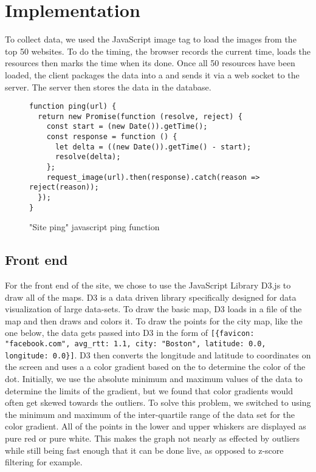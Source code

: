 \section{Implementation}\label{sec:web_ping_impl}

To collect data, we used the JavaScript image tag to load the images from the top 50 websites. To do the timing, the browser records the current time, loads the resources then marks the time when its done. Once all 50 resources have been loaded, the client packages the data into a \json and sends it via a web socket to the server. The server then stores the data in the database.

\begin{figure}
    \centering
    \small
    \begin{verbatim}
function ping(url) {
  return new Promise(function (resolve, reject) {
    const start = (new Date()).getTime();
    const response = function () {
      let delta = ((new Date()).getTime() - start);
      resolve(delta);
    };
    request_image(url).then(response).catch(reason => reject(reason));
  });
}
    \end{verbatim}
    \caption{"Site ping" javascript ping function}
    \label{fig:web_ping_code}
\end{figure}

\subsection{Front end}

For the front end of the site, we chose to use the JavaScript Library D3.js to draw all of the maps. D3 is a data driven library specifically designed for data visualization of large \json data-sets. To draw the basic map, D3 loads in a \json file of the map and then draws and colors it. To draw the points for the city map, like the one below, the data gets passed into D3 in the form of \texttt{\small [\{favicon: "facebook.com", avg\_rtt: 1.1, city: "Boston", latitude: 0.0, longitude: 0.0\}]}. D3 then converts the longitude and latitude to coordinates on the screen and uses a a color gradient based on the \rtt to determine the color of the dot. Initially, we use the absolute minimum and maximum values of the data to determine the limits of the gradient, but we found that color gradients would often get skewed towards the outliers. To solve this problem, we switched to using the minimum and maximum of the inter-quartile range of the data set for the color gradient. All of the points in the lower and upper whiskers are displayed as pure red or pure white. This makes the graph not nearly as effected by outliers while still being fast enough that it can be done live, as opposed to z-score filtering for example.

